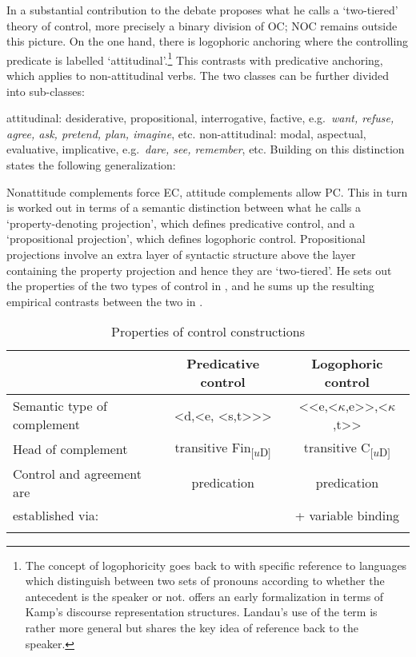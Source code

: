 \documentclass[output=paper,hidelinks]{langscibook}
\begin{document}
In a substantial contribution to the debate \citet{Landau2015} proposes what he calls a `two-tiered' theory of control, more precisely a binary division of OC; NOC remains outside this picture. On the one hand, there is logophoric anchoring where the controlling predicate is labelled `attitudinal'.\footnote{The concept of logophoricity goes back to \citet{Hagege1974} with specific reference to languages which distinguish between two sets of pronouns according to whether the antecedent is the speaker or not. \citet{Sells:Log} offers an early formalization in terms of Kamp's discourse representation structures. Landau's use of the term is rather more general but shares the key idea of reference back to the speaker.} This contrasts with predicative anchoring, which applies to non-attitudinal verbs. The two classes can be further divided into sub-classes:

\ea\label{ex:Control:63}
\ea\label{ex:Control:63a} attitudinal: desiderative, propositional, interrogative, factive, e.g.\ \emph{want,   refuse, agree, ask, pretend, plan, imagine}, etc.
\ex\label{ex:Control:63b} non-attitudinal: modal, aspectual, evaluative, implicative, e.g.\ \emph{dare, see, remember}, etc.
\z\z
Building on this distinction \citet[20]{Landau2015} states the following generalization:

\ea\label{ex:Control:64}  Nonattitude complements force EC, attitude complements allow PC.
\z
This in turn is worked out in terms of a semantic distinction between what he calls a `property-denoting projection', which defines predicative control, and a `propositional projection', which defines logophoric control. Propositional projections involve an extra layer of syntactic structure above the layer containing the property projection and hence they are `two-tiered'. He sets out the properties of the two types of control in , and he sums up the resulting empirical contrasts between the two in .

\begin{table}
  \begin{tabularx}{\textwidth}{Xcc}
  \lsptoprule
    & Predicative control & Logophoric control\\
    \midrule
    Semantic type of complement & <d,<e, <s,t>{>}> & <{<}e,<$\kappa$,e{>}>,<$\kappa$,t{>}>\\\hline
    Head of complement & transitive Fin\textsubscript{[$u$D]} & transitive C\textsubscript{[$u$D]}\\\hline
    Control and agreement are & predication & predication\\
    established via: &  &  + variable binding\\
    \lspbottomrule
 \end{tabularx}
\caption{Properties of control constructions \citep[83]{Landau2015}}\label{table:Control:4}
\end{table}
\end{document}
